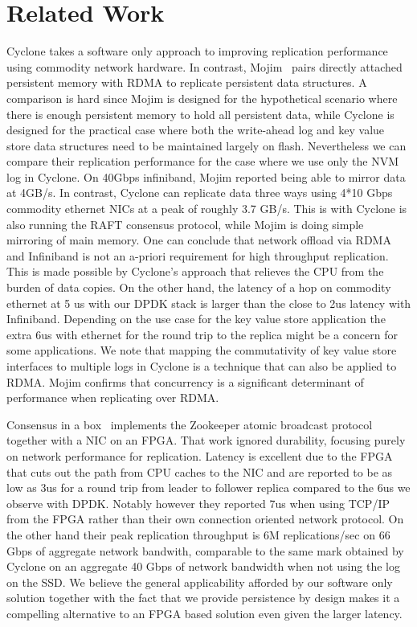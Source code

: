\documentclass[pageno]{jpaper}
\begin{document}
\section{Related Work}

Cyclone takes a software only approach to improving replication performance
using commodity network hardware. In contrast, Mojim~\cite{mojim} pairs directly
attached persistent memory with RDMA to replicate persistent data structures. A
comparison is hard since Mojim is designed for the hypothetical scenario where
there is enough persistent memory to hold all persistent data, while Cyclone is
designed for the practical case where both the write-ahead log and key value
store data structures need to be maintained largely on flash. Nevertheless we
can compare their replication performance for the case where we use only the NVM
log in Cyclone. On 40Gbps infiniband, Mojim reported being able to mirror data
at 4GB/s. In contrast, Cyclone can replicate data three ways using 4*10 Gbps
commodity ethernet NICs at a peak of roughly 3.7 GB/s. This is with
Cyclone is also running the RAFT consensus protocol, while Mojim is doing simple
mirroring of main memory. One can conclude that network offload via RDMA and
Infiniband is not an a-priori requirement for high throughput replication. This
is made possible by Cyclone's approach that relieves the CPU from the burden of
data copies. On the other hand, the latency of a hop on commodity ethernet at 5 us with
our DPDK stack is larger than the close to 2us latency with
Infiniband. Depending on the use case for the key value store application the
extra 6us with ethernet for the round trip to the replica might be a concern for
some applications. We note that mapping the commutativity of key value store
interfaces to multiple logs in Cyclone is a technique that can also be applied
to RDMA. Mojim confirms that concurrency is a significant
determinant of performance when replicating over RDMA.

Consensus in a box~\cite{consensus_box} implements the Zookeeper atomic
broadcast protocol together with a NIC on an FPGA. That work ignored durability,
focusing purely on network performance for replication. Latency is
excellent due to the FPGA that cuts out the path from CPU caches to the NIC and
are reported to be as low as 3us for a round trip from leader to follower
replica compared to the 6us we observe with DPDK. Notably however they reported
7us when using TCP/IP from the FPGA rather than their own connection oriented
network protocol. On the other hand their peak replication throughput is 6M
replications/sec on 66 Gbps of aggregate network bandwith, comparable to the
same mark obtained by Cyclone on an aggregate 40 Gbps of network bandwidth when
not using the log on the SSD. We believe the general applicability afforded by
our software only solution together with the fact that we provide persistence by
design makes it a compelling alternative to an FPGA based solution even given
the larger latency.
\end{document}

